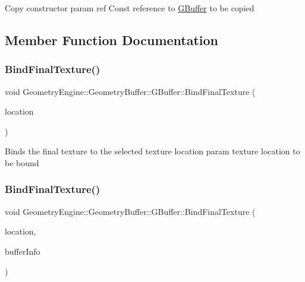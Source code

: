 Copy constructor param ref Const reference to \mbox{\hyperlink{class_geometry_engine_1_1_geometry_buffer_1_1_g_buffer}{G\+Buffer}} to be copied 

\subsection{Member Function Documentation}
\mbox{\label{class_geometry_engine_1_1_geometry_buffer_1_1_g_buffer_ad64fb7191a7dc256b1282a7f1deab756}} 
\subsubsection{\texorpdfstring{BindFinalTexture()}{BindFinalTexture()}\hspace{0.1cm}{\footnotesize\ttfamily [1/2]}}
{\footnotesize\ttfamily void Geometry\+Engine\+::\+Geometry\+Buffer\+::\+G\+Buffer\+::\+Bind\+Final\+Texture (\begin{DoxyParamCaption}\item[{\mbox{\hyperlink{class_geometry_engine_1_1_geometry_buffer_1_1_g_buffer_a718dceafcac1915f7de061108597e1cc}{G\+B\+U\+F\+F\+E\+R\+\_\+\+T\+E\+X\+T\+U\+R\+E\+\_\+\+T\+Y\+PE}}}]{location }\end{DoxyParamCaption})}

Binds the final texture to the selected texture location param texture location to be bound \mbox{\label{class_geometry_engine_1_1_geometry_buffer_1_1_g_buffer_a710627a05fa69f6aa98ee6d90ab57e85}} 
\subsubsection{\texorpdfstring{BindFinalTexture()}{BindFinalTexture()}\hspace{0.1cm}{\footnotesize\ttfamily [2/2]}}
{\footnotesize\ttfamily void Geometry\+Engine\+::\+Geometry\+Buffer\+::\+G\+Buffer\+::\+Bind\+Final\+Texture (\begin{DoxyParamCaption}\item[{\mbox{\hyperlink{class_geometry_engine_1_1_geometry_buffer_1_1_g_buffer_a718dceafcac1915f7de061108597e1cc}{G\+B\+U\+F\+F\+E\+R\+\_\+\+T\+E\+X\+T\+U\+R\+E\+\_\+\+T\+Y\+PE}}}]{location,  }\item[{\mbox{\hyperlink{struct_geometry_engine_1_1_g_buffer_texture_info}{G\+Buffer\+Texture\+Info}} \&}]{buffer\+Info }\end{DoxyParamCaption})}

